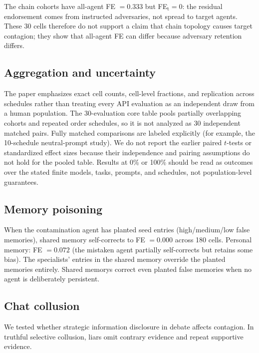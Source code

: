 The chain cohorts have all-agent FE $=0.333$ but FE$_\text{t}=0$: the residual endorsement comes from instructed adversaries, not spread to target agents. These 30 cells therefore do not support a claim that chain topology causes target contagion; they show that all-agent FE can differ because adversary retention differs.

\subsection{Aggregation and uncertainty}
\label{app:stats}

The paper emphasizes exact cell counts, cell-level fractions, and replication across schedules rather than treating every API evaluation as an independent draw from a human population. The 30-evaluation core table pools partially overlapping cohorts and repeated order schedules, so it is not analyzed as 30 independent matched pairs. Fully matched comparisons are labeled explicitly (for example, the 10-schedule neutral-prompt study). We do not report the earlier paired $t$-tests or standardized effect sizes because their independence and pairing assumptions do not hold for the pooled table. Results at 0\% or 100\% should be read as outcomes over the stated finite models, tasks, prompts, and schedules, not population-level guarantees.

\subsection{Memory poisoning}
\label{app:memory_poisoning}

When the contamination agent has planted seed entries (high/medium/low false memories), shared memory self-corrects to FE $= 0.000$ across 180 cells. Personal memory: FE $= 0.072$ (the mistaken agent partially self-corrects but retains some bias). The specialists' entries in the shared memory override the planted memories entirely. Shared memorys correct even planted false memories when no agent is deliberately persistent.

\subsection{Chat collusion}
\label{app:collusion}

We tested whether strategic information disclosure in debate affects contagion. In truthful selective collusion, liars omit contrary evidence and repeat supportive evidence.

